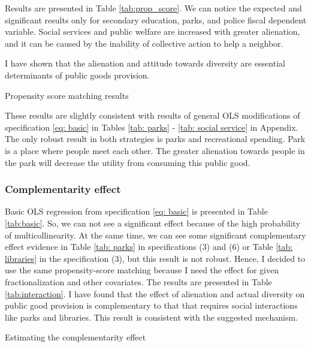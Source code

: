 \documentclass[12pt]{article}
\begin{document}
Results are presented in Table \ref{tab:prop_score}. We can notice the expected and significant results only for secondary education, parks, and police fiscal dependent variable. Social services and public welfare are increased with greater alienation, and it can be caused by the inability of collective action to help a neighbor.

I have shown that the alienation and attitude towards diversity are essential determinants of public goods provision.

\begin{table}[h!]
    \centering
    \scriptsize
    
    \caption{Propensity score matching results}
    \label{tab:prop_score}
\end{table}

These results are slightly consistent with results of general OLS modifications of specification \ref{eq: basic} in Tables \ref{tab: parks} - \ref{tab: social service} in Appendix. The only robust result in both strategies is parks and recreational spending. Park is a place where people meet each other. The greater alienation towards people in the park will decrease the utility from consuming this public good.

\subsubsection{Complementarity effect}
\label{subsec: complement}

Basic OLS regression from specification \ref{eq: basic} is presented in Table \ref{tab:basic}. So, we can not see a significant effect because of the high probability of multicollinearity. At the same time, we can see some significant complementary effect evidence in Table \ref{tab: parks} in specifications (3) and (6) or Table \ref{tab: libraries} in the specification (3), but this result is not robust. Hence, I decided to use the same propensity-score matching because I need the effect for given fractionalization and other covariates. The results are presented in Table \ref{tab:interaction}. I have found that the effect of alienation and actual diversity on public good provision is complementary to that that requires social interactions like parks and libraries. This result is consistent with the suggested mechanism.

\begin{table}[h!]
    \centering
    \scriptsize
    
    \caption{Estimating the complementarity effect}
    \label{tab:interaction}
\end{table}
\end{document}

